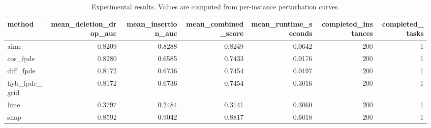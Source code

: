 \begin{table}[t]
\caption{Experimental results. Values are computed from per-instance perturbation curves.}
\label{tab:main_results_computed}
\centering
\begin{tabular}{lrrrrrr}
\toprule
method & mean\_deletion\_drop\_auc & mean\_insertion\_auc & mean\_combined\_score & mean\_runtime\_seconds & completed\_instances & completed\_tasks \\
\midrule
aime & 0.8209 & 0.8288 & 0.8249 & 0.0642 & 200 & 1 \\
cos\_fpde & 0.8280 & 0.6585 & 0.7433 & 0.0176 & 200 & 1 \\
diff\_fpde & 0.8172 & 0.6736 & 0.7454 & 0.0197 & 200 & 1 \\
hyb\_fpde\_grid & 0.8172 & 0.6736 & 0.7454 & 0.3016 & 200 & 1 \\
lime & 0.3797 & 0.2484 & 0.3141 & 0.3060 & 200 & 1 \\
shap & 0.8592 & 0.9042 & 0.8817 & 0.6018 & 200 & 1 \\
\bottomrule
\end{tabular}

\end{table}
